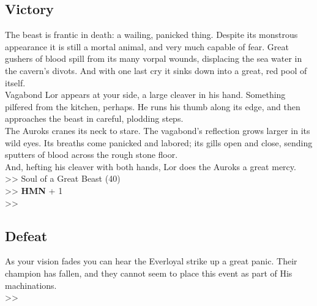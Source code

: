 \pagebreak

\subsection*{Victory}
The beast is frantic in death: a wailing, panicked thing. Despite its monstrous appearance it is still a mortal animal, and very much capable of fear. Great gushers of blood spill from its many vorpal wounds, displacing the sea water in the cavern's divots. And with one last cry it sinks down into a great, red pool of itself.\\

Vagabond Lor appears at your side, a large cleaver in his hand. Something pilfered from the kitchen, perhaps. He runs his thumb along its edge, and then approaches the beast in careful, plodding steps.\\

The Auroks cranes its neck to stare. The vagabond’s reflection grows larger in its wild eyes. Its breaths come panicked and labored; its gills open and close, sending sputters of blood across the rough stone floor.\\

And, hefting his cleaver with both hands, Lor does the Auroks a great mercy.\\

>> Soul of a Great Beast (40)\\
>> \textbf{HMN} + 1\\
>> 

\subsection*{Defeat}
As your vision fades you can hear the Everloyal strike up a great panic. Their champion has fallen, and they cannot seem to place this event as part of His machinations.\\
>> 